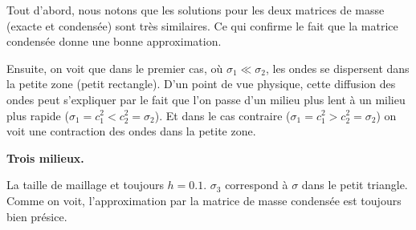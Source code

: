 \documentclass[12pt]{article}
\begin{document}
Tout d'abord, nous notons que les solutions pour les deux matrices de masse (exacte et condensée) sont très similaires. Ce qui confirme le fait que la matrice condensée donne une bonne approximation. 

Ensuite, on voit que dans le premier cas, où $\sigma_1 \ll \sigma_2$, les ondes se dispersent dans la petite zone (petit rectangle). D'un point de vue physique, cette diffusion des ondes peut s'expliquer par le fait que l'on passe d'un milieu plus lent à un milieu plus rapide ($\sigma_1 = c_1^2 < c_2^2= \sigma_2$). Et dans le cas contraire ($\sigma_1 = c_1^2 > c_2^2= \sigma_2$) on voit une contraction des ondes dans la petite zone.

\textbf{Trois milieux.}

La taille de maillage et toujours $h=0.1$. $\sigma_3$ correspond à $\sigma$ dans le petit triangle. Comme on voit, l'approximation par la matrice de masse condensée est toujours bien présice.
\end{document}
